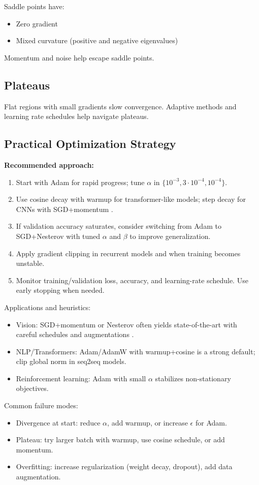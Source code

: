 Saddle points have:
\begin{itemize}
    \item Zero gradient
    \item Mixed curvature (positive and negative eigenvalues)
\end{itemize}

Momentum and noise help escape saddle points.

\subsection{Plateaus}

Flat regions with small gradients slow convergence. Adaptive methods and learning rate schedules help navigate plateaus.

\subsection{Practical Optimization Strategy}

\textbf{Recommended approach:}
\begin{enumerate}
    \item Start with Adam \cite{Kingma2014} for rapid progress; tune $\alpha$ in $\{10^{-3},3\cdot10^{-4},10^{-4}\}$.
    \item Use cosine decay with warmup for transformer-like models; step decay for CNNs with SGD+momentum \cite{WebOptimizationDLBook,D2LChapterOptimization,He2016}.
    \item If validation accuracy saturates, consider switching from Adam to SGD+Nesterov with tuned $\alpha$ and $\beta$ to improve generalization.
    \item Apply gradient clipping in recurrent models and when training becomes unstable.
    \item Monitor training/validation loss, accuracy, and learning-rate schedule. Use early stopping when needed.
\end{enumerate}

Applications and heuristics:
\begin{itemize}
    \item Vision: SGD+momentum or Nesterov often yields state-of-the-art with careful schedules and augmentations \cite{He2016}.
    \item NLP/Transformers: Adam/AdamW with warmup+cosine is a strong default; clip global norm in seq2seq models.
    \item Reinforcement learning: Adam with small $\alpha$ stabilizes non-stationary objectives.
\end{itemize}

Common failure modes:
\begin{itemize}
    \item Divergence at start: reduce $\alpha$, add warmup, or increase \(\epsilon\) for Adam.
    \item Plateau: try larger batch with warmup, use cosine schedule, or add momentum.
    \item Overfitting: increase regularization (weight decay, dropout), add data augmentation.
\end{itemize}
